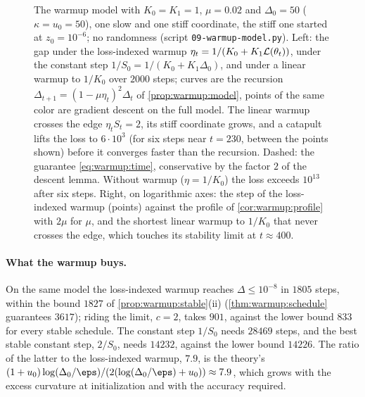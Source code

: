\begin{refsection}
\begin{figure}[t]
\begin{fullwidth}
\end{fullwidth}
\caption{The warmup model with $K_0=K_1=1$, $\mu=0.02$ and $\Delta_0=50$ ($\kappa=u_0=50$), one slow and one stiff coordinate, the stiff one started at $z_0=10^{-6}$; no randomness (script \texttt{09-warmup-model.py}). Left: the gap under the loss-indexed warmup $\eta_t=1/(K_0+K_1\mathcal{L}(\theta_t))$, under the constant step $1/S_0=1/(K_0+K_1\Delta_0)$, and under a linear warmup to $1/K_0$ over $2000$ steps; curves are the recursion $\Delta_{t+1}=(1-\mu\eta_t)^2\Delta_t$ of \cref{prop:warmup:model}, points of the same color are gradient descent on the full model. The linear warmup crosses the edge $\eta_tS_t=2$, its stiff coordinate grows, and a catapult lifts the loss to $6\cdot10^3$ (for six steps near $t=230$, between the points shown) before it converges faster than the recursion. Dashed: the guarantee \eqref{eq:warmup:time}, conservative by the factor $2$ of the descent lemma. Without warmup ($\eta=1/K_0$) the loss exceeds $10^{13}$ after six steps. Right, on logarithmic axes: the step of the loss-indexed warmup (points) against the profile of \cref{cor:warmup:profile} with $2\mu$ for $\mu$, and the shortest linear warmup to $1/K_0$ that never crosses the edge, which touches its stability limit at $t\approx400$.}
\label{fig:warmup:model}
\end{figure}

\paragraph{What the warmup buys.} On the same model the loss-indexed warmup reaches $\Delta\le10^{-8}$ in $1805$ steps, within the bound $1827$ of \cref{prop:warmup:stable}(ii) (\cref{thm:warmup:schedule} guarantees $3617$); riding the limit, $c=2$, takes $901$, against the lower bound $833$ for every stable schedule. The constant step $1/S_0$ needs $28469$ steps, and the best stable constant step, $2/S_0$, needs $14232$, against the lower bound $14226$. The ratio of the latter to the loss-indexed warmup, $7.9$, is the theory's $(1+u_0)\log(\Delta_0/\eps)/(2(\log(\Delta_0/\eps)+u_0))\approx7.9$, which grows with the excess curvature at initialization and with the accuracy required.


\end{refsection}
